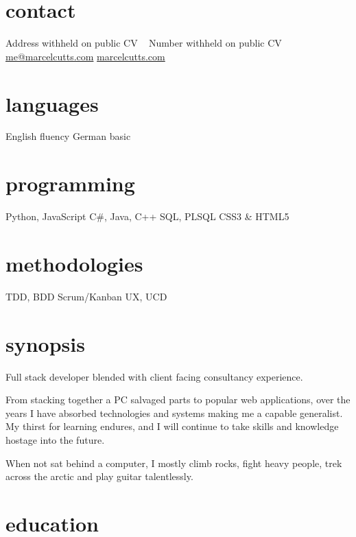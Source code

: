\documentclass[]{friggeri-cv} %
\begin{document}


\begin{aside} %
\section{contact}
Address withheld on public CV
~
Number withheld on public CV
~
\href{mailto:me@marcelcutts.com}{me@marcelcutts.com}
\href{http://www.marcelcutts.com}{marcelcutts.com}
\section{languages}
English fluency
German basic
\section{programming}
Python, JavaScript
C\#, Java, C++
SQL, PLSQL
CSS3 \& HTML5
\section{methodologies}
TDD, BDD
Scrum/Kanban
UX, UCD
\end{aside}


\section{synopsis}

Full stack developer blended with client facing consultancy experience.

From stacking together a PC salvaged parts to popular web applications, over the years I have absorbed technologies and systems making me a capable generalist. My thirst for learning endures, and I will continue to take skills and knowledge hostage into the future. 

When not sat behind a computer, I mostly climb rocks, fight heavy people, trek across the arctic and play guitar talentlessly.

\section{education}
\end{document}
